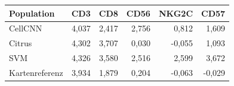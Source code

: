 \begin{tabular}{lrrrrr}
\toprule
Population & CD3 & CD8 & CD56 & NKG2C & CD57 \\
\midrule
CellCNN & 4,037 & 2,417 & 2,756 & 0,812 & 1,609 \\
Citrus & 4,302 & 3,707 & 0,030 & -0,055 & 1,093 \\
SVM & 4,326 & 3,580 & 2,516 & 2,599 & 3,672 \\
Kartenreferenz & 3,934 & 1,879 & 0,204 & -0,063 & -0,029 \\
\bottomrule
\end{tabular}

